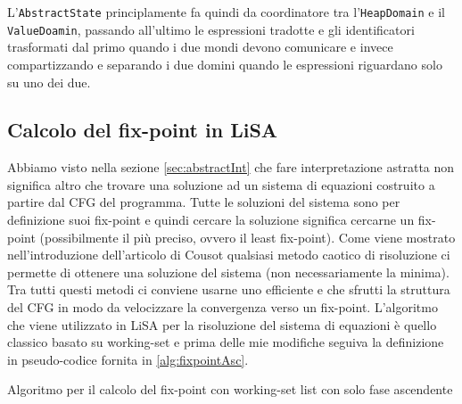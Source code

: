 L'\texttt{AbstractState} principlamente fa quindi da coordinatore tra l'\texttt{HeapDomain} e il \texttt{ValueDoamin}, passando all'ultimo le espressioni tradotte e gli identificatori trasformati dal primo quando i due mondi devono comunicare e invece compartizzando e separando i due domini quando le espressioni riguardano solo su uno dei due.

\subsection{Calcolo del fix-point in LiSA}\label{sec:fix-pointLiSA}
Abbiamo visto nella sezione \ref{sec:abstractInt} che fare interpretazione astratta non significa altro che trovare una soluzione ad un sistema di equazioni costruito a partire dal CFG del programma. Tutte le soluzioni del sistema sono per definizione suoi fix-point e quindi cercare la soluzione significa cercarne un fix-point (possibilmente il più preciso, ovvero il least fix-point). Come viene mostrato nell'introduzione dell'articolo di Cousot \cite{Cousot-IMAG-RR88-1977} qualsiasi metodo caotico di risoluzione ci permette di ottenere una soluzione del sistema (non necessariamente la minima). Tra tutti questi metodi ci conviene usarne uno efficiente e che sfrutti la struttura del CFG in modo da velocizzare la convergenza verso un fix-point. L'algoritmo che viene utilizzato in LiSA per la risoluzione del sistema di equazioni è quello classico basato su working-set e prima delle mie modifiche seguiva la definizione in pseudo-codice fornita in \ref{alg:fixpointAsc}.

\begin{algorithm}
	\caption{Algoritmo per il calcolo del fix-point con working-set list con solo fase ascendente}
	\label{alg:fixpointAsc}
	\begin{algorithmic}[1]
		\Statex
        
                \Else
                \EndIf
            \EndIf
        \EndWhile
		\State {}
        
	\end{algorithmic}
\end{algorithm}

